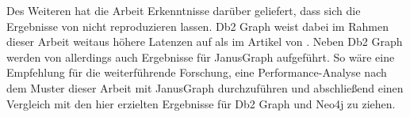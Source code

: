 Des Weiteren hat die Arbeit Erkenntnisse darüber geliefert, dass sich die Ergebnisse von  nicht reproduzieren lassen. Db2 Graph weist dabei im Rahmen dieser Arbeit weitaus höhere Latenzen auf als im Artikel von . Neben Db2 Graph werden von  allerdings auch Ergebnisse für JanusGraph aufgeführt. So wäre eine Empfehlung für die weiterführende Forschung, eine Performance-Analyse nach dem Muster dieser Arbeit mit JanusGraph durchzuführen und abschließend einen Vergleich mit den hier erzielten Ergebnisse für Db2 Graph und Neo4j zu ziehen.